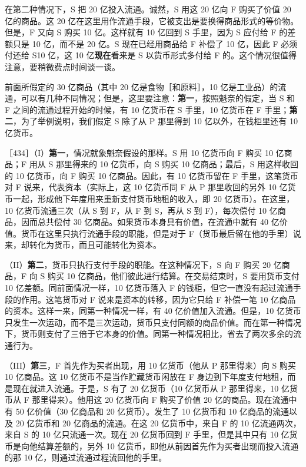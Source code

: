 在第二种情况下，S 把 20 亿投入流通。诚然，S 用这 20 亿向 F 购买了价值 20 亿的商品。这 20 亿在这里用作流通手段，它被支出是要换得商品形式的等价物。但是，F 又向 S 购买 10 亿。这样就有 10 亿回到 S 手里，因为 S 应付给 F 的差额只是 10 亿，而不是 20 亿。S 现在已经用商品给 F 补偿了 10 亿，因此 F 必须付还给 S10 亿，这 10 亿\textbf{现在}看来是 S 以货币形式多付给 F 的。这个情况很值得注意，要稍微费点时间谈一谈。

前面所假定的 30 亿商品（其中 20 亿是食物［和原料］，10 亿是工业品）的流通，可以有几种不同情况；但是，这里要注意：\textbf{第一}，按照魁奈的假定，当 S 和 F 之间的流通过程开始的时候，有 10 亿货币在 S 手里，10 亿货币在 F 手里；\textbf{第二}，为了举例说明，我们假定 S 除了从 P 那里得到 10 亿以外，在钱柜里还有 10 亿货币。

［434］（I）\textbf{第一}，情况就象魁奈假设的那样。S 用 10 亿货币向 F 购买 10 亿商品；F 用从 S 那里得来的 10 亿货币，向 S 购买 10 亿商品；最后，S 用这样收回的 10 亿货币，向 F 购买 10 亿商品。因此，有 10 亿货币留在 F 手里，这笔货币对 F 说来，代表资本（实际上，这 10 亿货币同 F 从 P 那里收回的另外 10 亿货币一起，形成他下年度用来重新支付货币地租的收入，即 20 亿货币）。在这里，10 亿货币流通三次（从 S 到 F，从 F 到 S，再从 S 到 F），每次偿付 10 亿商品，因而总共偿付 30 亿商品。如果货币本身具有价值，在流通中就有 40 亿价值。货币在这里只执行流通手段的职能，但是对于 F（货币最后留在他的手里）说来，却转化为货币，而且可能转化为资本。

（II）\textbf{第二}，货币只执行支付手段的职能。在这种情况下，S 向 F 购买 20 亿商品，F 向 S 购买 10 亿商品，他们彼此进行结算。在交易结束时，S 要用货币支付 10 亿差额。同前面情况一样，10 亿货币落入 F 的钱柜，但它一直没有起过流通手段的作用。这笔货币对 F 说来是资本的转移，因为它只给 F 补偿一笔 10 亿商品的资本。这样一来，同第一种情况一样，有 40 亿价值加入流通。但是，10 亿货币只发生一次运动，而不是三次运动，货币只支付同额的商品价值。而在第一种情况下，货币则支付了三倍于它本身的价值。同第一种情况相比，省去了两次多余的流通行为。

（III）\textbf{第三}，F 首先作为买者出现，用 10 亿货币（他从 P 那里得来）向 S 购买 10 亿商品。这 10 亿货币不是当作贮藏货币闲放在 F 身边到下年度支付地租，而是现在就进入流通。于是，S 有了 20 亿货币（10 亿货币从 P 那里得来，10 亿货币从 F 那里得来）。他用这 20 亿货币向 F 购买了价值 20 亿的商品。现在流通中有 50 亿价值（30 亿商品和 20 亿货币）。发生了 10 亿货币和 10 亿商品的流通以及 20 亿货币和 20 亿商品的流通。在这 20 亿货币中，来自 F 的 10 亿流通两次，来自 S 的 10 亿只流通一次。现在 20 亿货币回到 F 手里，但是其中只有 10 亿货币是向他结算差额的，另外 10 亿货币，即他从前因首先作为买者出现而投入流通的那 10 亿，则通过流通过程流回他的手里。

